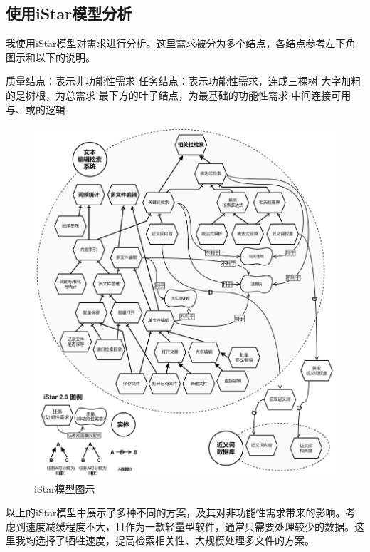\documentclass[scheme = chinese]{ctexart}
\begin{document}
\clearpage

\subsection{使用iStar模型分析}

我使用iStar模型对需求进行分析。这里需求被分为多个结点，各结点参考左下角图示和以下的说明。

\begin{outline}
    \1 质量结点：表示非功能性需求
    \1 任务结点：表示功能性需求，连成三棵树
        \2 大字加粗的是树根，为总需求
        \2 最下方的叶子结点，为最基础的功能性需求
        \2 中间连接可用与、或的逻辑
\end{outline}

\begin{figure}[h]
    \centering
    \includegraphics[width=\textwidth]{images/iStar.png}
    \caption{iStar模型图示}
\end{figure}

以上的iStar模型中展示了多种不同的方案，及其对非功能性需求带来的影响。考虑到速度减缓程度不大，且作为一款轻量型软件，通常只需要处理较少的数据。这里我均选择了牺牲速度，提高检索相关性、大规模处理多文件的方案。
\end{document}
